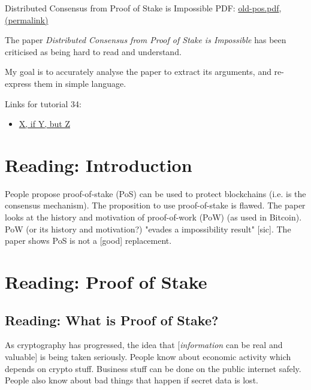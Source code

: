 \documentclass{article}
\begin{document}
Distributed Consensus from Proof of Stake is Impossible PDF: \href{../../files/pdfs/2014-05-28-distributed-consensus-pos/old-pos.pdf}{old-pos.pdf}, \href{https://xertrov.github.io/fi/files/pdfs/2014-05-28-distributed-consensus-pos/old-pos.pdf}{(permalink)}

The paper \emph{Distributed Consensus from Proof of Stake is Impossible} has been criticised as being hard to read and understand.

My goal is to accurately analyse the paper to extract its arguments, and re-express them in simple language.

Links for tutorial 34:

\begin{itemize}
    \item \hyperlink{ex10}{X, if Y, but Z}
\end{itemize}


\tableofcontents

\section{Reading: Introduction}

People propose proof-of-stake (PoS) can be used to protect blockchains (i.e. is the consensus mechanism).
The proposition to use proof-of-stake is flawed.
The paper looks at the history and motivation of proof-of-work (PoW) (as used in Bitcoin).
PoW (or its history and motivation?) "evades a impossibility result" [sic].
The paper shows PoS is not a [good] replacement.

\section{Reading: Proof of Stake}

\subsection{Reading: What is Proof of Stake?}

As cryptography has progressed, the idea that [\emph{information} can be real and valuable] is being taken seriously.
People know about economic activity which depends on crypto stuff.
Business stuff can be done on the public internet safely.
People also know about bad things that happen if secret data is lost.
\end{document}
